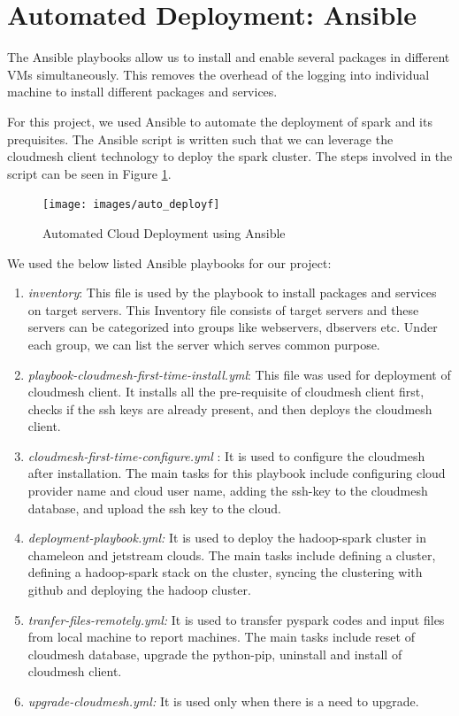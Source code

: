 \documentclass[9pt,twocolumn,twoside]{styles/osajnl}
\begin{document}
\section{Automated Deployment: Ansible}
The Ansible playbooks allow us to install and enable several packages in different VMs simultaneously. This removes the overhead of the logging into individual machine to install different packages and services.

For this project, we used Ansible to automate the deployment of spark and its prequisites. The Ansible script is written such that we can leverage the cloudmesh client technology to deploy the spark cluster. The steps involved in the script can be seen in Figure \ref{fig:ansible}.

\begin{figure}[h]
\centering
\texttt{[image: images/auto\_deployf]}
\caption{Automated Cloud Deployment using Ansible}
\label{fig:ansible}
\end{figure}

We used the below listed Ansible playbooks for our project:
\begin{enumerate}
\item \textit{inventory}: This file is used by the playbook to install packages and services on target servers. This Inventory file consists of target servers and these servers can be categorized into groups like webservers, dbservers etc. Under each group, we can list the server which serves common purpose.
\item \textit{playbook-cloudmesh-first-time-install.yml}: This file was used for deployment of cloudmesh client. It installs all the pre-requisite of cloudmesh client first, checks if the ssh keys are already present, and then deploys the cloudmesh client.
\item \textit{cloudmesh-first-time-configure.yml} : It is used to configure the cloudmesh after installation. The main tasks for this playbook include configuring cloud provider name and cloud user name, adding the ssh-key to the cloudmesh database, and upload the ssh key to the cloud.

\item \textit{deployment-playbook.yml:} It is used to deploy the hadoop-spark cluster in chameleon and jetstream clouds. The main tasks include defining a cluster, defining a hadoop-spark stack on the cluster, syncing the clustering with github and deploying the hadoop cluster.

\item  \textit{tranfer-files-remotely.yml:} It is used to transfer pyspark codes and input files from local machine to report machines. The main tasks include reset of cloudmesh database, upgrade the python-pip, uninstall and install of cloudmesh client.

\item \textit{upgrade-cloudmesh.yml:} It is used only when there is a need to upgrade.
\end{enumerate}
\end{document}
